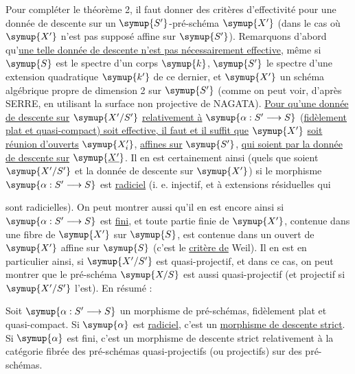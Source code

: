 Pour compléter le théorème 2, il faut donner des critères d'effectivité pour
une donnée de descente sur un $\symup{S'}$-pré-schéma $\symup{X'}$ (dans le cas où $\symup{X'}$ n'est
pas supposé affine sur $\symup{S'}$). Remarquons d'abord qu'\uline{une telle donnée de descente n'est pas nécessairement effective}, même si $\symup{S}$ est le spectre d'un
corps $\symup{k}$, $\symup{S'}$ le spectre d'une extension quadratique $\symup{k'}$ de ce dernier, et
$\symup{X'}$ un schéma algébrique propre de dimension 2 sur $\symup{S'}$ (comme on peut voir,
d'après SERRE, en utilisant la surface non projective de NAGATA). \uline{Pour qu'une donnée de descente sur} $\symup{X'/S'}$ \uline{relativement à} $\symup{\alpha:S'\longrightarrow S}$ (\uline{fidèlement plat et quasi-compact) soit effective, il faut et il suffit que} $\symup{X'}$ \uline{soit réunion d'ouverts} $\symup{X'_i}$, \uline{affines sur} $\symup{S'}$, \uline{qui soient  par la donnée de descente sur} $\symup{\underline{X'}}$. Il en est
certainement ainsi (quels que soient $\symup{X'/S'}$ et la donnée de descente sur $\symup{X'}$)
si le morphisme $\symup{\alpha:S'\longrightarrow S}$ est \uline{radiciel} (i. e.
injectif, et à extensions résiduelles qui

sont radicielles). On peut montrer aussi qu'il en est encore ainsi si
$\symup{\alpha:S'\longrightarrow S}$ est \uline{fini}, et toute partie finie de $\symup{X'}$,
contenue dans une fibre de $\symup{X'}$ sur $\symup{S}$, est contenue dans un ouvert de $\symup{X'}$
affine sur $\symup{S}$ (c'est le \uline{critère de} Weil). Il en est en particulier
ainsi, si $\symup{X'/S'}$ est quasi-projectif, et dans ce cas, on peut montrer que le
pré-schéma  $\symup{X/S}$ est aussi quasi-projectif (et projectif si $\symup{X'/S'}$
l'est). En résumé :

 Soit $\symup{\alpha:S'\longrightarrow S}$ un morphisme de
pré-schémas, fidèlement plat et quasi-compact. Si $\symup{\alpha}$ est \uline{radiciel},
c'est un \uline{morphisme de descente strict}. Si $\symup{\alpha}$ est fini, c'est un
morphisme de descente strict relativement à la catégorie fibrée des pré-schémas
quasi-projectifs (ou projectifs) sur des pré-schémas.


